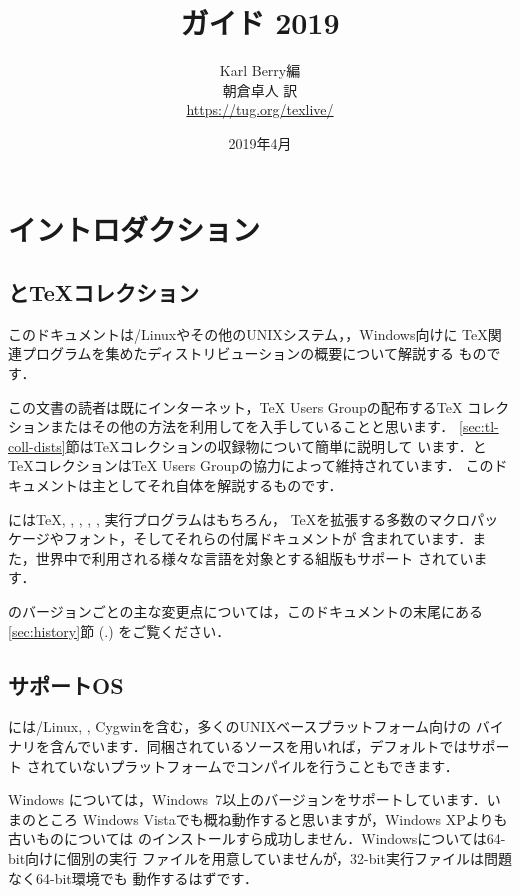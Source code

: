 \documentclass[uplatex,dvipdfmx]{jsarticle}
\title{{\huge {\TL ガイド 2019}}}
\author{%
  Karl Berry編 \\
  朝倉卓人 訳 \\[3mm]
  \url{https://tug.org/texlive/}
}
\date{2019年4月}
\begin{document}
\maketitle
\thispagestyle{empty}

\tableofcontents

\section{イントロダクション}\label{sec:intro}

\subsection{\TL と\TeX コレクション}

このドキュメントは\GNU/Linuxやその他のUNIXシステム，\macOS，Windows向けに
\TeX 関連プログラムを集めたディストリビューション\TL の概要について解説する
ものです．

この文書の読者は既にインターネット，{\TeX} Users Groupの配布する\TeX
コレクション\DVD またはその他の方法を利用して\TL を入手していることと思います．
\ref{sec:tl-coll-dists}節は\TeX コレクション\DVD の収録物について簡単に説明して
います．\TL と\TeX コレクションは{\TeX} Users Groupの協力によって維持されています．
このドキュメントは主として\TL それ自体を解説するものです．

\TL には\TeX, \LaTeXe, \ConTeXt, \MF, \MP, \BibTeX 実行プログラムはもちろん，
\TeX を拡張する多数のマクロパッケージやフォント，そしてそれらの付属ドキュメントが
含まれています．また，世界中で利用される様々な言語を対象とする組版もサポート
されています．

\TL のバージョンごとの主な変更点については，このドキュメントの末尾にある
\ref{sec:history}節 (\p.\pageref{sec:history}) をご覧ください．

\subsection{サポートOS}
\label{sec:os-support}

\TL には\GNU/Linux, \macOS, Cygwinを含む，多くのUNIXベースプラットフォーム向けの
バイナリを含んでいます．同梱されているソースを用いれば，デフォルトではサポート
されていないプラットフォームでコンパイルを行うこともできます．

Windows については，Windows~7以上のバージョンをサポートしています．いまのところ
Windows Vistaでも概ね動作すると思いますが，Windows XPよりも古いものについては
\TL のインストールすら成功しません．Windowsについては64-bit向けに個別の実行
ファイルを用意していませんが，32-bit実行ファイルは問題なく64-bit環境でも
動作するはずです．
\end{document}
